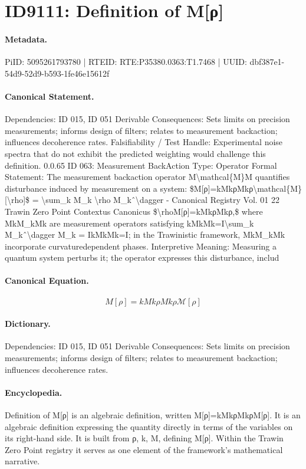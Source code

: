 \section*{ID9111: Definition of M[ρ]}
\paragraph{Metadata.}
PiID: 5095261793780 | RTEID: RTE:P35380.0363:T1.7468 | UUID: dbf387e1-54d9-52d9-b593-1fe46e15612f

\paragraph{Canonical Statement.}
Dependencies: ID 015, ID 051 Derivable Consequences: Sets limits on precision measurements; informs design of filters; relates to measurement backaction; influences decoherence rates. Falsifiability / Test Handle: Experimental noise spectra that do not exhibit the predicted weighting would challenge this definition. 0.0.65 ID 063: Measurement BackAction Type: Operator Formal Statement: The measurement backaction operator M\textbackslash{}mathcal\{M\}M quantifies disturbance induced by measurement on a system: \$M[ρ]=kMkρMkρ\textbackslash{}mathcal\{M\}[\textbackslash{}rho]\$ = \textbackslash{}sum\_k M\_k \textbackslash{}rho M\_kˆ\textbackslash{}dagger - Canonical Registry Vol. 01 22 Trawin Zero Point Contextus Canonicus \$\textbackslash{}rhoM[ρ]=kMkρMkρ,\$ where MkM\_kMk are measurement operators satisfying kMkMk=I\textbackslash{}sum\_k M\_kˆ\textbackslash{}dagger M\_k = IkMkMk=I; in the Trawinistic framework, MkM\_kMk incorporate curvaturedependent phases. Interpretive Meaning: Measuring a quantum system perturbs it; the operator expresses this disturbance, includ

\paragraph{Canonical Equation.}
\[
M[ρ]=kMkρMkρ\mathcal{M}[\rho]
\]

\paragraph{Dictionary.}
Dependencies: ID 015, ID 051 Derivable Consequences: Sets limits on precision measurements; informs design of filters; relates to measurement backaction; influences decoherence rates.

\paragraph{Encyclopedia.}
Definition of M[ρ] is an algebraic definition, written M[ρ]=kMkρMkρM[ρ]. It is an algebraic definition expressing the quantity directly in terms of the variables on its right-hand side. It is built from ρ, k, M, defining M[ρ]. Within the Trawin Zero Point registry it serves as one element of the framework's mathematical narrative.
